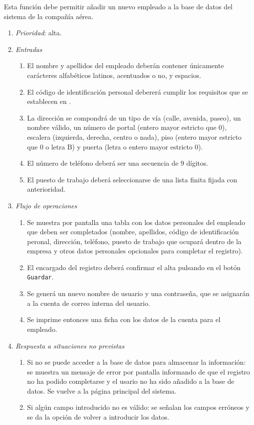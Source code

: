 	Esta función debe permitir añadir un nuevo empleado a la base de datos del sistema de la compañía aérea.

\begin{enumerate}
	\item \textit{Prioridad}: alta.
	\item \textit{Entradas}
	\begin{enumerate}
		\item El nombre y apellidos del empleado deberán contener únicamente carácteres alfabéticos latinos, acentuados o no, y espacios.
		\item El código de identificación personal debererá cumplir los requisitos que se establecen en .
		\item La dirección se compondrá de un tipo de vía (calle, avenida, paseo), un nombre válido, un número de portal (entero mayor estricto que 0), escalera (izquierda, derecha, centro o nada), piso (entero mayor estricto que 0 o letra B) y puerta (letra o entero mayor estricto 0).
		\item El número de teléfono deberá ser una secuencia de 9 dígitos.
		\item El puesto de trabajo deberá seleccionarse de una lista finita fijada con anterioridad.
	\end{enumerate}
	\item \textit{Flujo de operaciones}
	\begin{enumerate}
		\item Se muestra por pantalla una tabla con los datos personales del empleado que deben ser completados (nombre, apellidos, código de identificación peronal, dirección, teléfono, puesto de trabajo que ocupará dentro de la empresa y otros datos personales opcionales para completar el registro).
		\item El encargado del registro deberá confirmar el alta pulsando en el botón \verb|Guardar|.
		\item Se generá un nuevo nombre de usuario y una contraseña, que se asignarán a la cuenta de correo interna del usuario.
		\item Se imprime entonces una ficha con los datos de la cuenta para el empleado.
	\end{enumerate}
	\item \textit{Respuesta a situaciones no previstas}
	\begin{enumerate}
		\item Si no se puede acceder a la base de datos para almacenar la información: se muestra un mensaje de error por pantalla informando de que el registro no ha podido completarse y el usario no ha sido añadido a la base de datos. Se vuelve a la página principal del sistema.
		\item Si algún campo introducido no es válido: se señalan los campos erróneos y se da la opción de volver a introducir los datos.
	\end{enumerate}

\end{enumerate}
